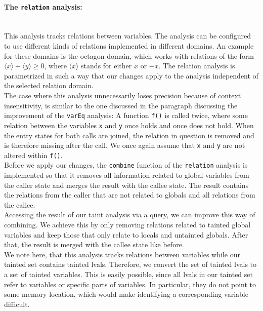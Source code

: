       \paragraph{The \texttt{relation} analysis:}\mbox{}\\
        This analysis tracks relations between variables. The analysis can be configured to use different kinds of relations implemented in different domains. An example for these domains is the octagon domain, which works with relations of the form $\langle x \rangle + \langle y \rangle \geq 0$, where $\langle x \rangle$ stands for either $x$ or $-x$. The relation analysis is parametrized in such a way that our changes apply to the analysis independent of the selected relation domain.\\
        The case where this analysis unnecessarily loses precision because of context insensitivity, is similar to the one discussed in the paragraph discussing the improvement of the \texttt{varEq} analysis: A function \texttt{f()} is called twice, where some relation between the variables \texttt{x} and \texttt{y} once holds and once does not hold. When the entry states for both calls are joined, the relation in question is removed and is therefore missing after the call. We once again assume that \texttt{x} and \texttt{y} are not altered within \texttt{f()}.\\
        Before we apply our changes, the \texttt{combine} function of the \texttt{relation} analysis is implemented so that it removes all information related to global variables from the caller state and merges the result with the callee state. The result contains the relations from the caller that are not related to globals and all relations from the callee.\\
        Accessing the result of our taint analysis via a query, we can improve this way of combining. We achieve this by only removing relations related to tainted global variables and keep those that only relate to locals and untainted globals. After that, the result is merged with the callee state like before.\\
        We note here, that this analysis tracks relations between variables while our tainted set contains tainted \ac{lval}s. Therefore, we convert the set of tainted \ac{lval}s to a set of tainted variables. This is easily possible, since all \ac{lval}s in our tainted set refer to variables or specific parts of variables. In particular, they do not point to some memory location, which would make identifying a corresponding variable difficult.

